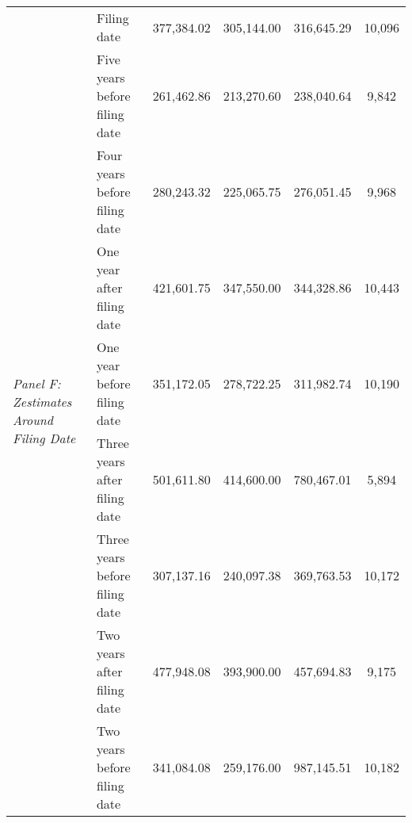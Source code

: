 \begin{tabular}{llcccc}
\multirow[c]{9}{3cm}{\textit{Panel F: Zestimates Around Filing Date}} & Filing date & 377,384.02 & 305,144.00 & 316,645.29 & 10,096 \\
 & Five years before filing date & 261,462.86 & 213,270.60 & 238,040.64 & 9,842 \\
 & Four years before filing date & 280,243.32 & 225,065.75 & 276,051.45 & 9,968 \\
 & One year after filing date & 421,601.75 & 347,550.00 & 344,328.86 & 10,443 \\
 & One year before filing date & 351,172.05 & 278,722.25 & 311,982.74 & 10,190 \\
 & Three years after filing date & 501,611.80 & 414,600.00 & 780,467.01 & 5,894 \\
 & Three years before filing date & 307,137.16 & 240,097.38 & 369,763.53 & 10,172 \\
 & Two years after filing date & 477,948.08 & 393,900.00 & 457,694.83 & 9,175 \\
 & Two years before filing date & 341,084.08 & 259,176.00 & 987,145.51 & 10,182 \\
\cline{1-6}
\bottomrule
\end{tabular}
